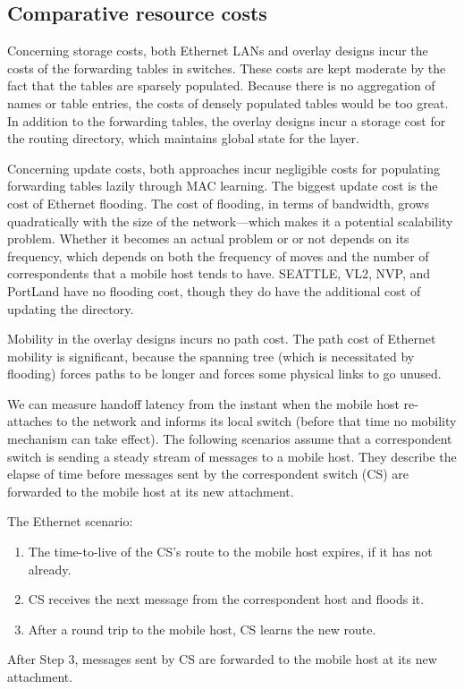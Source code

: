 \subsection{Comparative resource costs}
\label{sec:props}

Concerning storage costs, both Ethernet LANs and overlay designs
incur the costs of the
forwarding tables in switches.
These costs are kept moderate by the fact that the tables are sparsely
populated.
Because there is no aggregation of names or table entries, the costs
of densely populated tables would be too great.
In addition to the forwarding tables, the overlay designs incur a storage cost
for the routing directory, which maintains global state for the layer.

Concerning update costs, both approaches incur negligible costs for 
populating forwarding tables lazily through MAC learning.
The biggest update cost is the cost of Ethernet flooding.
The cost of flooding, in terms of bandwidth, grows quadratically with the
size of the network---which makes it a potential scalability problem.
Whether it becomes an actual problem or
or not depends on its frequency, which
depends on both the frequency of moves and the number of correspondents
that a mobile host tends to have.
SEATTLE, VL2, NVP, and PortLand have no flooding cost, though
they do have the additional cost of updating the directory.

Mobility in the overlay designs incurs no path cost.
The path cost of Ethernet mobility is significant, because the spanning
tree (which is necessitated by flooding) forces paths to be longer and
forces some physical links to go unused.

We can measure handoff latency from the instant when the mobile host
re-attaches to the network and informs its local switch (before that
time no mobility mechanism can take effect).
The following scenarios assume that a correspondent switch is sending
a steady stream of messages to a mobile host.
They describe the elapse of time before messages sent by the
correspondent switch (CS) are forwarded to the mobile host at its new
attachment.

The Ethernet scenario:
\begin{enumerate}
\item
The time-to-live of the CS's route to the mobile host expires, if it has
not already.
\item
CS receives the next message from the correspondent host and floods it.
\item
After a round trip to the mobile host, CS learns the new route.
\end{enumerate}
After Step 3, messages sent by CS are forwarded to the mobile host at
its new attachment.

